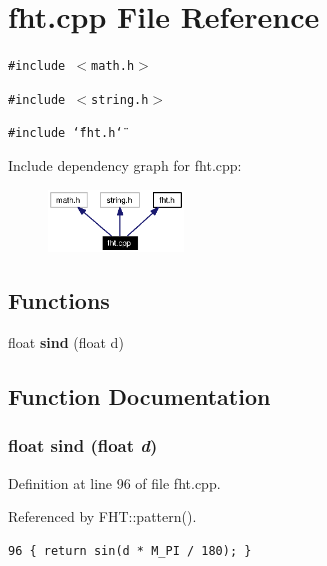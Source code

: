 \section{fht.cpp File Reference}
\label{fht_8cpp}


{\tt \#include $<$math.h$>$}\par
{\tt \#include $<$string.h$>$}\par
{\tt \#include \char`\"{}fht.h\char`\"{}}\par


Include dependency graph for fht.cpp:\begin{figure}[H]
\begin{center}
\leavevmode
\includegraphics[width=102pt]{fht_8cpp__incl}
\end{center}
\end{figure}
\subsection*{Functions}
\begin{CompactItemize}
\item 
float {\bf sind} (float d)
\end{CompactItemize}


\subsection{Function Documentation}
\subsubsection{\setlength{\rightskip}{0pt plus 5cm}float sind (float {\em d})\hspace{0.3cm}{\tt  [inline, static]}}\label{fht_8cpp_a0}




Definition at line 96 of file fht.cpp.

Referenced by FHT::pattern().



\footnotesize\begin{verbatim}96 { return sin(d * M_PI / 180); }
\end{verbatim}\normalsize 
